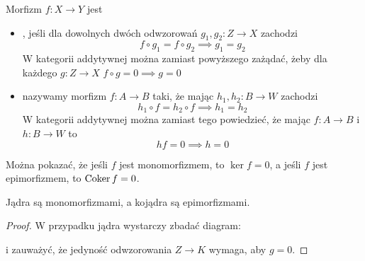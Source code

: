 \begin{definition}
  Morfizm $f:X\to Y$ jest
  \begin{itemize}
    \item {}, jeśli dla dowolnych dwóch odwzorowań $g_1,g_2:Z\to X$ zachodzi
      $$f\circ g_1=f\circ g_2\implies g_1=g_2$$
      W kategorii addytywnej można zamiast powyższego zażądać, żeby dla każdego $g:Z\to X$ $f\circ g=0\implies g=0$
    \item {} nazywamy morfizm $f:A\to B$ taki, że mając $h_1,h_2:B\to W$ zachodzi
      $$h_1\circ f=h_2\circ f\implies h_1=h_2$$
      W kategorii addytywnej można zamiast tego powiedzieć, że mając $f:A\to B$ i $h:B\to W$ to
      $$hf=0\implies h=0$$
  \end{itemize}
\end{definition}

Można pokazać, że jeśli $f$ jest monomorfizmem, to $\ker f=0$, a jeśli $f$ jest epimorfizmem, to $\operatorname{Coker} f=0$.

\begin{lemma}
  Jądra są monomorfizmami, a kojądra są epimorfizmami.
\end{lemma}

\begin{proof}
  W przypadku jądra wystarczy zbadać diagram:
  \begin{center}\end{center}
  i zauważyć, że jedyność odwzorowania $Z\to K$ wymaga, aby $g=0$.
\end{proof}
